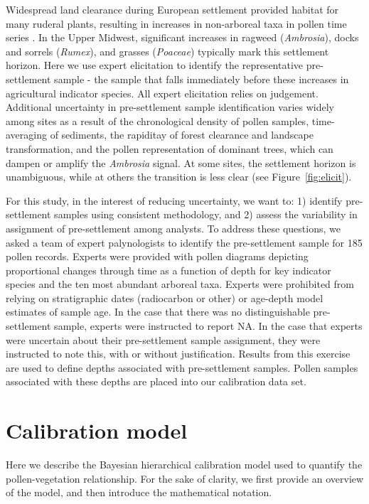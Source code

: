 \documentclass[12pt]{article}
\begin{document}
Widespread land clearance during European settlement provided habitat
for many ruderal plants, resulting in increases in non-arboreal taxa
in pollen time series \citep{mcandrews1988human}. In the Upper
Midwest, significant increases in ragweed (\textit{Ambrosia}), docks
and sorrels (\textit{Rumex}), and grasses (\textit{Poaceae}) typically
mark this settlement horizon. Here we use expert elicitation to
identify the representative pre-settlement sample - the sample that
falls immediately before these increases in agricultural indicator
species. All expert elicitation relies on judgement. Additional
uncertainty in pre-settlement sample identification varies widely
among sites as a result of the chronological density of pollen
samples, time-averaging of sediments, the rapiditay of forest
clearance and landscape transformation, and the pollen representation
of dominant trees, which can dampen or amplify the \textit{Ambrosia}
signal. At some sites, the settlement horizon is unambiguous, while at
others the transition is less clear (see Figure~\ref{fig:elicit}).

For this study, in the interest of reducing uncertainty, we want to:
1) identify pre-settlement samples using consistent methodology, and
2) assess the variability in assignment of pre-settlement among
analysts. To address these questions, we asked a team of expert
palynologists to identify the pre-settlement sample for 185 pollen
records. Experts were provided with pollen diagrams depicting
proportional changes through time as a function of depth for key
indicator species and the ten most abundant arboreal taxa. Experts
were prohibited from relying on stratigraphic dates (radiocarbon or
other) or age-depth model estimates of sample age. In the case that
there was no distinguishable pre-settlement sample, experts were
instructed to report NA. In the case that experts were uncertain about
their pre-settlement sample assignment, they were instructed to note
this, with or without justification. Results from this exercise are
used to define depths associated with pre-settlement samples. Pollen
samples associated with these depths are placed into our calibration
data set.

\section{Calibration model}

Here we describe the Bayesian hierarchical calibration model used to
quantify the pollen-vegetation relationship. For the sake of clarity,
we first provide an overview of the model, and then introduce the
mathematical notation.
\end{document}
